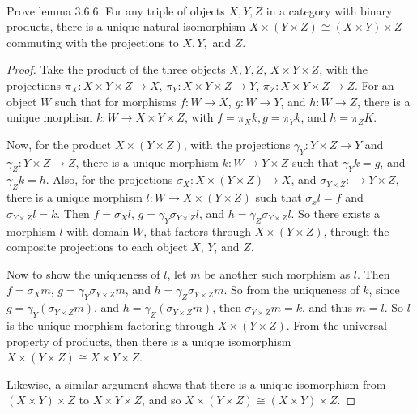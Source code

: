 \documentclass[main.tex]{subfiles}
\begin{document}
\paragraph{}
\begin{exercise}
Prove lemma 3.6.6. For any triple of objects $X, Y, Z$ in a category with binary products, there is a unique natural isomorphism $X \times (Y \times Z) \cong (X \times Y) \times Z$ commuting with the projections to $X, Y,$ and $Z$.
\end{exercise}

	
\begin{proof}
Take the product of the three objects $X, Y, Z$, $X \times Y \times Z$, with the projections $\pi_X : X \times Y \times Z \rightarrow X$, $\pi_Y : X \times Y \times Z \rightarrow Y$, $\pi_Z : X \times Y \times Z \rightarrow Z$. For an object $W$ such that for morphisms $f: W \rightarrow X$, $g: W \rightarrow Y$, and $h: W \rightarrow Z$, there is a unique morphism $k: W \rightarrow X \times Y \times Z$, with $f = \pi_Xk, g = \pi_Yk$, and $h = \pi_ZK$.

Now, for the product $X \times (Y \times Z)$, with the projections $\gamma_Y : Y \times Z \rightarrow Y$ and $\gamma_Z : Y \times Z \rightarrow Z$, there is a unique morphism $k: W \rightarrow Y \times Z$ such that $\gamma_Y k = g$, and $\gamma_Z k = h$. Also, for the projections $\sigma_X : X \times (Y \times Z) \rightarrow X$, and $\sigma_{Y \times Z} : \rightarrow Y \times Z$, there is a unique morphism $l: W \rightarrow X \times (Y \times Z)$ such that $\sigma_x l = f$ and $\sigma_{Y \times Z}l = k$. Then $f = \sigma_Xl$, $g = \gamma_Y \sigma_{Y \times Z} l$, and $h = \gamma_Z \sigma_{Y \times Z} l$. So there exists a morphism $l$ with domain $W$, that factors through $X \times (Y \times Z)$, through the composite projections to each object $X$, $Y$, and $Z$.

Now to show the uniqueness of $l$, let $m$ be another such morphism as $l$. Then $f = \sigma_X m$, $g = \gamma_Y \sigma_{Y \times Z} m$, and $h = \gamma_Z \sigma_{Y \times Z} m$. So from the uniqueness of $k$, since $g = \gamma_Y (\sigma_{Y \times Z} m)$, and $h = \gamma_Z (\sigma_{Y \times Z} m)$, then $\sigma_{Y \times Z} m = k$, and thus $m = l$. So $l$ is the unique morphism factoring through $X \times (Y \times Z)$. From the universal property of products, then there is a unique isomorphism $X \times (Y \times Z) \cong X \times Y \times Z$.

Likewise, a similar argument shows that there is a unique isomorphism from $(X \times Y) \times Z$ to $X \times Y \times Z$, and so $X \times (Y \times Z) \cong (X \times Y) \times Z$.

\end{proof}	
	
	
\end{document}
